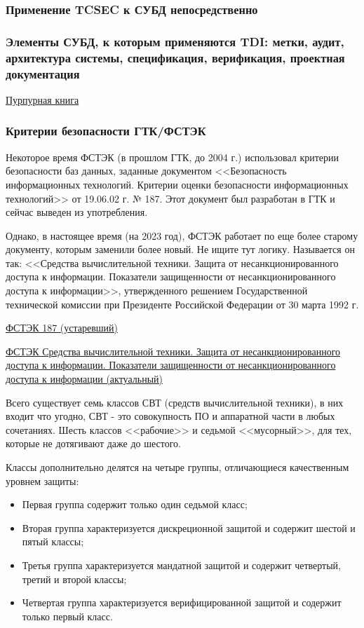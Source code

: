 \subsubsection{Применение TCSEC к СУБД непосредственно}

\subsubsection{Элементы СУБД, к которым применяются TDI: метки, аудит, архитектура системы, спецификация, верификация, проектная документация}

\href{https://web.archive.org/web/20160303230445/http://ftp.fas.org/irp/nsa/rainbow/tg021.htm}{Пурпурная книга}

\subsubsection{Критерии безопасности ГТК/ФСТЭК}

Некоторое время ФСТЭК (в прошлом ГТК, до 2004 г.) использовал критерии безопасности баз данных, заданные документом <<Безопасность информационных технологий. Критерии оценки безопасности информационных технологий>> от 19.06.02 г. № 187. Этот документ был разработан в ГТК и сейчас выведен из употребления.

Однако, в настоящее время (на 2023 год), ФСТЭК работает по еще более старому документу, которым заменили более новый. Не ищите тут логику. Называется он так:
<<Средства вычислительной техники. Защита от несанкционированного доступа к информации. Показатели защищенности от несанкционированного доступа к информации>>, утвержденного решением Государственной технической комиссии при Президенте Российской Федерации от 30 марта 1992 г.

\href{https://fstec.ru/component/attachments/download/293}{ФСТЭК 187 (устаревший)}

\href{https://fstec.ru/component/attachments/download/296}{ФСТЭК Средства вычислительной техники. Защита от несанкционированного доступа к информации. Показатели защищенности от несанкционированного доступа к информации (актуальный)}

Всего существует семь классов СВТ (средств вычислительной техники), в них входит что угодно, СВТ - это совокупность ПО и аппаратной части в любых сочетаниях. Шесть классов <<рабочие>> и седьмой <<мусорный>>, для тех, которые не дотягивают даже до шестого.

Классы дополнительно делятся на четыре группы, отличающиеся качественным уровнем защиты:
\begin{itemize}
	\item Первая группа содержит только один седьмой класс;
	\item Вторая группа характеризуется дискреционной защитой и содержит шестой и пятый классы;
	\item Третья группа характеризуется мандатной защитой и содержит четвертый, третий и второй классы;
	\item Четвертая группа характеризуется верифицированной защитой и содержит только первый класс.
\end{itemize}

